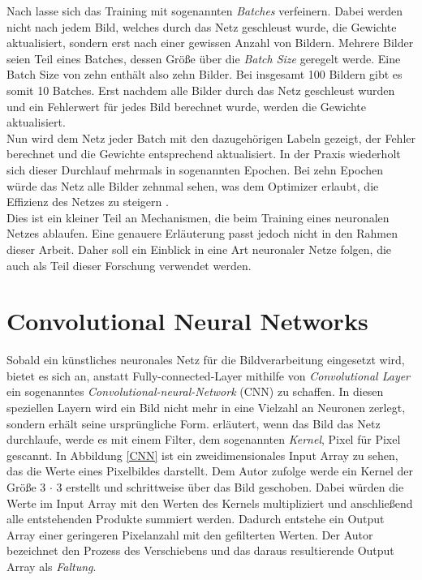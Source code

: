 Nach \citet[]{brownlee-2019} lasse sich das Training mit sogenannten \textit{Batches} verfeinern. Dabei werden nicht nach jedem Bild, welches durch das Netz geschleust wurde, die Gewichte aktualisiert, sondern erst nach einer gewissen Anzahl von Bildern. Mehrere Bilder seien Teil eines Batches, dessen Größe über die \textit{Batch Size} geregelt werde. Eine Batch Size von zehn enthält also zehn Bilder. Bei insgesamt 100 Bildern gibt es somit 10 Batches. Erst nachdem alle Bilder durch das Netz geschleust wurden und ein Fehlerwert für jedes Bild berechnet wurde, werden die Gewichte aktualisiert.\\

Nun wird dem Netz jeder Batch mit den dazugehörigen Labeln gezeigt, der Fehler berechnet und die Gewichte entsprechend aktualisiert. In der Praxis wiederholt sich dieser Durchlauf mehrmals in sogenannten Epochen. Bei zehn Epochen würde das Netz alle Bilder zehnmal sehen, was dem Optimizer erlaubt, die Effizienz des Netzes zu steigern \parencite[155]{traiq_neuron}.\\

Dies ist ein kleiner Teil an Mechanismen, die beim Training eines neuronalen Netzes ablaufen. Eine genauere Erläuterung passt jedoch nicht in den Rahmen dieser Arbeit. Daher soll ein Einblick in eine Art neuronaler Netze folgen, die auch als Teil dieser Forschung verwendet werden.

\section{Convolutional Neural Networks}
Sobald ein künstliches neuronales Netz für die Bildverarbeitung eingesetzt wird, bietet es sich an, anstatt Fully-connected-Layer mithilfe von \textit{Convolutional Layer} ein sogenanntes \textit{Convolutional-neural-Network} (CNN) zu schaffen. In diesen speziellen Layern wird ein Bild nicht mehr in eine Vielzahl an Neuronen zerlegt, sondern erhält seine ursprüngliche Form. \citet[135]{tariq_gan} erläutert, wenn das Bild das Netz durchlaufe, werde es mit einem Filter, dem sogenannten \textit{Kernel}, Pixel für Pixel gescannt. In Abbildung \ref{CNN} ist ein zweidimensionales Input Array zu sehen, das die Werte eines Pixelbildes darstellt. Dem Autor zufolge werde ein Kernel der Größe 3 $\cdot$ 3 erstellt und schrittweise über das Bild geschoben. Dabei würden die Werte im Input Array mit den Werten des Kernels multipliziert und anschließend alle entstehenden Produkte summiert werden. Dadurch entstehe ein Output Array einer geringeren Pixelanzahl mit den gefilterten Werten. Der Autor bezeichnet den Prozess des Verschiebens und das daraus resultierende Output Array als \textit{Faltung}.

